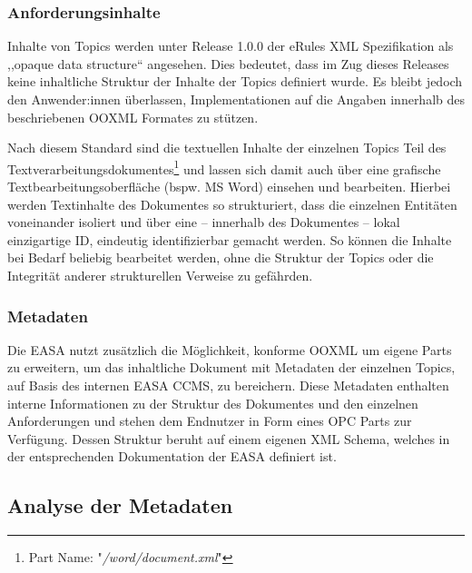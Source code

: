 \subsubsection{Anforderungsinhalte}

    Inhalte von Topics werden unter Release 1.0.0 der eRules \ac{XML} Spezifikation als ,,opaque data structure`` angesehen.
    Dies bedeutet, dass im Zug dieses Releases keine inhaltliche Struktur der Inhalte der Topics definiert wurde.
    Es bleibt jedoch den Anwender:innen überlassen, Implementationen auf die Angaben innerhalb des beschriebenen \acs{OOXML} Formates zu stützen.
    \cite[6]{easa_xml_doc}

    Nach diesem Standard sind die textuellen Inhalte der einzelnen Topics Teil des Textverarbeitungsdokumentes\footnote{Part Name: "\textit{/word/document.xml}"} und lassen sich damit auch über eine grafische Textbearbeitungsoberfläche (bspw. \ac{MS} Word) einsehen und bearbeiten.
    Hierbei werden Textinhalte des Dokumentes so strukturiert, dass die einzelnen Entitäten voneinander isoliert und über eine -- innerhalb des Dokumentes -- lokal einzigartige ID, eindeutig identifizierbar gemacht werden.
    So können die Inhalte bei Bedarf beliebig bearbeitet werden, ohne die Struktur der Topics oder die Integrität anderer strukturellen Verweise zu gefährden.

\subsubsection{Metadaten}

    Die \ac{EASA} nutzt zusätzlich die Möglichkeit, konforme \ac{OOXML} um eigene Parts zu erweitern, um das inhaltliche Dokument mit Metadaten der einzelnen Topics, auf Basis des internen \ac{EASA} \ac{CCMS}, zu bereichern.
    Diese Metadaten enthalten interne Informationen zu der Struktur des Dokumentes und den einzelnen Anforderungen und stehen dem Endnutzer in Form eines \ac{OPC} Parts  zur Verfügung.
    Dessen Struktur beruht auf einem eigenen \ac{XML} Schema, welches in der entsprechenden Dokumentation der \ac{EASA} definiert ist.

\pagebreak
\subsection{Analyse der Metadaten}
\label{ch:easa_anal}

